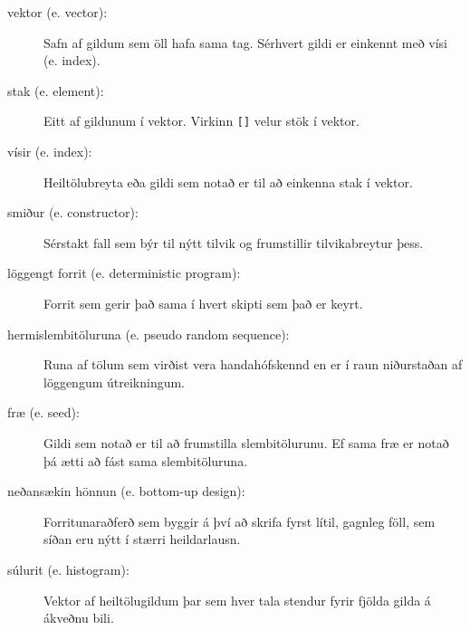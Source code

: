 \begin{description}

\item[vektor (e. vector):]  Safn af gildum sem öll hafa sama tag. Sérhvert gildi er einkennt með vísi (e. index).

\item[stak (e. element):]  Eitt af gildunum í vektor. Virkinn {\tt []} velur stök í vektor.

\item[vísir (e. index):]  Heiltölubreyta eða gildi sem notað er til að einkenna stak í vektor. 

\item[smiður (e. constructor):]  Sérstakt fall sem býr til nýtt tilvik og frumstillir tilvikabreytur þess.

\item[löggengt forrit (e. deterministic program):]  Forrit sem gerir það sama í hvert skipti sem það er keyrt.

\item[hermislembitöluruna (e. pseudo random sequence):]  Runa af tölum sem virðist vera handahófskennd en er í raun niðurstaðan af löggengum útreikningum.

\item[fræ (e. seed):]  Gildi sem notað er til að frumstilla slembitölurunu.
Ef sama fræ er notað þá ætti að fást sama slembitöluruna.

\item[neðansækin hönnun (e. bottom-up design):]  Forritunaraðferð sem byggir á því að skrifa fyrst lítil, gagnleg föll, sem síðan eru nýtt í stærri heildarlausn.

\item[súlurit (e. histogram):]  Vektor af heiltölugildum þar sem hver tala stendur fyrir fjölda gilda á ákveðnu bili.


\end{description}

